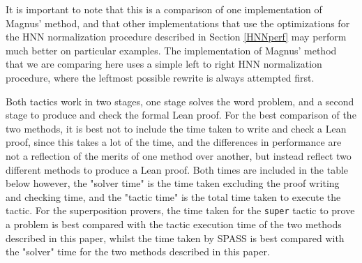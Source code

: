 \documentclass[12pt]{article} %
\theoremstyle{definition}
\theoremstyle{definition}
\theoremstyle{definition}
\theoremstyle{definition}
\theoremstyle{definition}
\theoremstyle{definition}
\begin{document}
It is important to note that this is a comparison of one implementation
of Magnus' method, and that other implementations that use the optimizations for the HNN
normalization procedure described in Section \ref{HNNperf} may perform much better on
particular examples. The implementation of Magnus' method that
we are comparing here uses a simple left to right HNN normalization
procedure, where the leftmost possible rewrite is always attempted first.

Both tactics work in two stages, one stage solves the word problem, and a second stage
to produce and check the formal Lean proof. For the best comparison of the two
methods, it is best not to include the time taken to write and check a Lean proof,
since this takes a lot of the time, and the differences in performance are not a reflection
of the merits of one method over another, but instead reflect two different methods
to produce a Lean proof. Both times are included in the table below however, the "solver
time" is the time taken excluding the proof writing and checking time, and
the "tactic time" is the total time taken to execute the tactic. For the superposition
provers, the time taken for the \lstinline{super} tactic to prove a problem is best compared
with the tactic execution time of the two methods described in this paper, whilst
the time taken by SPASS is best compared with the "solver" time for the two methods described in
this paper.
\end{document}
